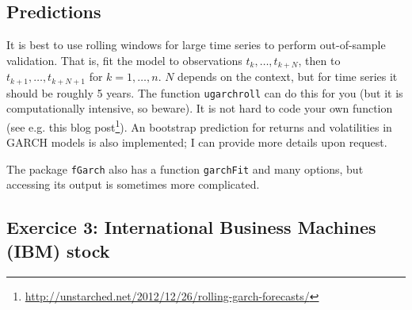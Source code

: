 \documentclass[]{book}
\newenvironment{Shaded}{\begin{snugshade}}{\end{snugshade}}
\newcommand{\CommentTok}[1]{\textcolor[rgb]{0.56,0.35,0.01}{\textit{#1}}}
\newcommand{\DataTypeTok}[1]{\textcolor[rgb]{0.13,0.29,0.53}{#1}}
\newcommand{\DecValTok}[1]{\textcolor[rgb]{0.00,0.00,0.81}{#1}}
\newcommand{\KeywordTok}[1]{\textcolor[rgb]{0.13,0.29,0.53}{\textbf{#1}}}
\newcommand{\NormalTok}[1]{#1}
\newcommand{\OperatorTok}[1]{\textcolor[rgb]{0.81,0.36,0.00}{\textbf{#1}}}
\newcommand{\OtherTok}[1]{\textcolor[rgb]{0.56,0.35,0.01}{#1}}
\newcommand{\StringTok}[1]{\textcolor[rgb]{0.31,0.60,0.02}{#1}}
\let\rmarkdownfootnote\footnote%
\def\footnote{\protect\rmarkdownfootnote}
\renewcommand{\href}[2]{#2\footnote{\url{#1}}}
\begin{document}
\hypertarget{predictions}{%
\subsection{Predictions}\label{predictions}}

It is best to use rolling windows for large time series to perform out-of-sample validation. That is, fit the model to observations \(t_k, \ldots, t_{k+N}\), then to \(t_{k+1}, \ldots, t_{k+N+1}\) for \(k=1, \ldots, n\). \(N\) depends on the context, but for time series it should be roughly 5 years. The function \texttt{ugarchroll} can do this for you (but it is computationally intensive, so beware). It is not hard to code your own function (see e.g. \href{http://unstarched.net/2012/12/26/rolling-garch-forecasts/}{this blog post}).
An bootstrap prediction for returns and volatilities in GARCH models is also implemented; I can provide more details upon request.

The package \texttt{fGarch} also has a function \texttt{garchFit} and many options, but accessing its output is sometimes more complicated.

\begin{Shaded}
\end{Shaded}

\hypertarget{exercice-3-international-business-machines-ibm-stock}{%
\subsection{Exercice 3: International Business Machines (IBM) stock}\label{exercice-3-international-business-machines-ibm-stock}}
\end{document}
